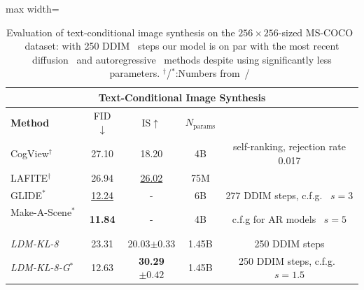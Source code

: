 \begin{center}
\begin{table}[thbp]
\begin{footnotesize}
\begin{adjustbox}{max width=\linewidth}

  \begin{tabular}[t]{lcccc}
    \toprule
    \multicolumn{5}{c}{\textbf{Text-Conditional Image Synthesis}} \\
    \midrule

    \textbf{Method} & FID $\downarrow$ & IS$\uparrow$ & $N_{\text{params}}$ & \\
    \midrule
	CogView$^{\dagger}$~\cite{DBLP:journals/corr/abs-2105-13290} & 27.10 & 18.20 & 4B & self-ranking, rejection rate 0.017\\
	LAFITE$^{\dagger}$~\cite{DBLP:journals/corr/abs-2111-13792} & 26.94 & \underline{26.02} & 75M & \\    
    GLIDE$^*$~\cite{DBLP:journals/corr/abs-2112-10741} & \underline{12.24} & - & 6B & 277 DDIM steps, c.f.g.~\cite{ho2021classifier} $s=3$ \\
	Make-A-Scene$^*$~\cite{DBLP:journals/corr/abs-2203-13131} & \textbf{11.84} & - & 4B & c.f.g for AR models~\cite{ar_cfg} $s=5$\\    
	\midrule    
    \emph{LDM-KL-8}& 23.31 & 20.03\tiny$\pm\text{0.33}$ & 1.45B & 250 DDIM steps\\
    \emph{LDM-KL-8-G}$^*$& 12.63 & \textbf{30.29\tiny$\pm\text{0.42}$}	 & 1.45B & 250 DDIM steps, c.f.g.~\cite{ho2021classifier} $s=1.5$\\    
  \bottomrule

\end{tabular}

\end{adjustbox}
\end{footnotesize}
 \caption{\label{tab:txt2img} Evaluation of text-conditional image synthesis on the
  $256 \times 256$-sized MS-COCO~\cite{DBLP:journals/corr/LinMBHPRDZ14} dataset: with 250 DDIM~\cite{DBLP:conf/iclr/SongME21} steps our model 
  is on par with the most recent diffusion~\cite{DBLP:journals/corr/abs-2112-10741} and autoregressive~\cite{DBLP:journals/corr/abs-2203-13131} methods despite using significantly less parameters. $^\dagger$/$^*$:Numbers from~\cite{DBLP:journals/corr/abs-2111-13792}/~\cite{DBLP:journals/corr/abs-2203-13131} }
\end{table}
\end{center}

